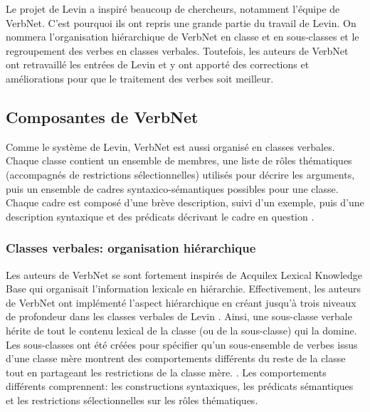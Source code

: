 Le projet de Levin a inspiré beaucoup de chercheurs, notamment l'équipe de VerbNet. C'est pourquoi ils ont repris une grande partie du travail de Levin. On nommera l'organisation hiérarchique de VerbNet en classe et en sous-classes et le regroupement des verbes en classes verbales. Toutefois, les auteurs de VerbNet ont retravaillé les entrées de Levin et y ont apporté des corrections et améliorations pour que le traitement des verbes soit meilleur\citep{verbnet.2006}.

\subsection {Composantes de VerbNet}  

Comme le système de Levin, VerbNet est aussi organisé en classes verbales. Chaque classe contient un ensemble de membres, une liste de rôles thématiques (accompagnés de restrictions sélectionnelles) utilisés pour décrire les arguments, puis un ensemble de cadres syntaxico-sémantiques possibles pour une classe. Chaque cadre est composé d'une brève description, suivi d'un exemple, puis d'une description syntaxique et des prédicats décrivant le cadre en question \citep{SchulerVerbnetBroadcoverageComprehensive2005}.

\subsubsection{Classes verbales: organisation hiérarchique}

Les auteurs de VerbNet se sont fortement inspirés de Acquilex Lexical Knowledge Base \citep{CopestakeACQUILEXLKBrepresentation1992} qui organisait l'information lexicale en hiérarchie. Effectivement, les auteurs de VerbNet ont implémenté l'aspect hiérarchique en créant jusqu'à trois niveaux de profondeur dans les classes verbales de Levin %
\citep{SchulerVerbnetBroadcoverageComprehensive2005}. Ainsi, une sous-classe verbale hérite de tout le contenu lexical de la classe (ou de la sous-classe) qui la domine. Les sous-classes ont été créées pour spécifier qu'un sous-ensemble de verbes issus d'une classe mère montrent des comportements différents du reste de la classe tout en partageant les restrictions de la classe mère. . Les comportements différents comprennent: les constructions syntaxiques, les prédicats sémantiques et les restrictions sélectionnelles sur les rôles thématiques.

